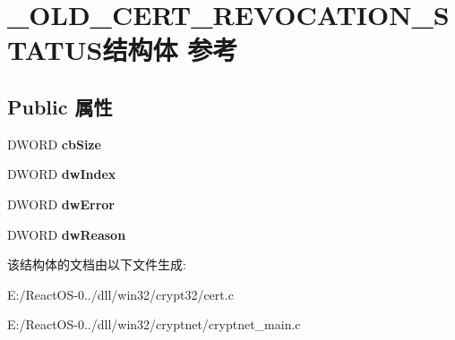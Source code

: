 \hypertarget{struct___o_l_d___c_e_r_t___r_e_v_o_c_a_t_i_o_n___s_t_a_t_u_s}{}\section{\+\_\+\+O\+L\+D\+\_\+\+C\+E\+R\+T\+\_\+\+R\+E\+V\+O\+C\+A\+T\+I\+O\+N\+\_\+\+S\+T\+A\+T\+U\+S结构体 参考}
\label{struct___o_l_d___c_e_r_t___r_e_v_o_c_a_t_i_o_n___s_t_a_t_u_s}
\subsection*{Public 属性}
\begin{DoxyCompactItemize}
\item 
\mbox{\label{struct___o_l_d___c_e_r_t___r_e_v_o_c_a_t_i_o_n___s_t_a_t_u_s_a8e5aff35f361d0b2f6cf5e964e8a785f}} 
D\+W\+O\+RD {\bfseries cb\+Size}
\item 
\mbox{\label{struct___o_l_d___c_e_r_t___r_e_v_o_c_a_t_i_o_n___s_t_a_t_u_s_a33a90570f1665fd866beb21a91805473}} 
D\+W\+O\+RD {\bfseries dw\+Index}
\item 
\mbox{\label{struct___o_l_d___c_e_r_t___r_e_v_o_c_a_t_i_o_n___s_t_a_t_u_s_a6f470d63f0cc5e6bf1065dd5f8aa3cec}} 
D\+W\+O\+RD {\bfseries dw\+Error}
\item 
\mbox{\label{struct___o_l_d___c_e_r_t___r_e_v_o_c_a_t_i_o_n___s_t_a_t_u_s_a70aca4093e51a9bed4c1775fb2ddf631}} 
D\+W\+O\+RD {\bfseries dw\+Reason}
\end{DoxyCompactItemize}


该结构体的文档由以下文件生成\+:\begin{DoxyCompactItemize}
\item 
E\+:/\+React\+O\+S-\/0../dll/win32/crypt32/cert.\+c\item 
E\+:/\+React\+O\+S-\/0../dll/win32/cryptnet/cryptnet\+\_\+main.\+c\end{DoxyCompactItemize}

